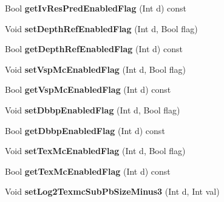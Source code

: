 \begin{DoxyCompactItemize}
Bool {\bfseries get\+Iv\+Res\+Pred\+Enabled\+Flag} (Int d) const
\item 
\mbox{\label{class_t_com_sps3d_extension_a622f651c8ed46515c2198058aa6393a4}} 
Void {\bfseries set\+Depth\+Ref\+Enabled\+Flag} (Int d, Bool flag)
\item 
\mbox{\label{class_t_com_sps3d_extension_abc8bd56fd310d564c6a039b393ee9966}} 
Bool {\bfseries get\+Depth\+Ref\+Enabled\+Flag} (Int d) const
\item 
\mbox{\label{class_t_com_sps3d_extension_a5ce4cd7c28d6f1e6358e8fc8cf8bc8bf}} 
Void {\bfseries set\+Vsp\+Mc\+Enabled\+Flag} (Int d, Bool flag)
\item 
\mbox{\label{class_t_com_sps3d_extension_ad3150da5ccead9c5b4af7b849c380ee4}} 
Bool {\bfseries get\+Vsp\+Mc\+Enabled\+Flag} (Int d) const
\item 
\mbox{\label{class_t_com_sps3d_extension_a036b136a0ff7f03a443ca32eaad38cdc}} 
Void {\bfseries set\+Dbbp\+Enabled\+Flag} (Int d, Bool flag)
\item 
\mbox{\label{class_t_com_sps3d_extension_a9103167c701475373f7dd43e5ff9762a}} 
Bool {\bfseries get\+Dbbp\+Enabled\+Flag} (Int d) const
\item 
\mbox{\label{class_t_com_sps3d_extension_a2d0a874f2a4902065c2ad5d7cb770f59}} 
Void {\bfseries set\+Tex\+Mc\+Enabled\+Flag} (Int d, Bool flag)
\item 
\mbox{\label{class_t_com_sps3d_extension_a1a03ea49c714ef0ab940558e9ad84f32}} 
Bool {\bfseries get\+Tex\+Mc\+Enabled\+Flag} (Int d) const
\item 
\mbox{\label{class_t_com_sps3d_extension_a762c9997eeeda9e254d46ff1120e7d5f}} 
Void {\bfseries set\+Log2\+Texmc\+Sub\+Pb\+Size\+Minus3} (Int d, Int val)
\item 
\mbox{\label{class_t_com_sps3d_extension_a35662de6b093933ac8f0b2a44be81c9d}} 

\end{DoxyCompactItemize}
